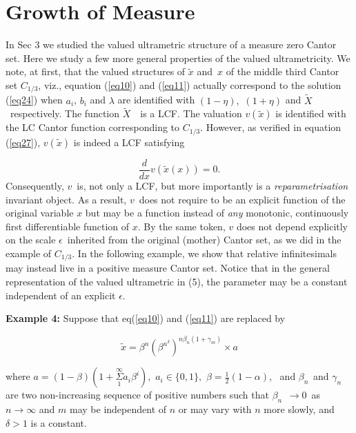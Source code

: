\documentclass[12pt]{article}
\begin{document}
\section{{Growth of Measure}}

In Sec 3 we studied the valued ultrametric structure of a measure zero
Cantor set. Here we study a few more general properties of the valued
ultrametricity. We note, at first, that the valued structures of $\tilde{x}$
and\ $x$ of the middle third Cantor set $C_{1/3}$, viz., equation (\ref{eq10})
and (\ref{eq11})  actually correspond to the solution (\ref{eq24}) when $a_i$, $b_i$ and $\lambda$ are identified with  $(1-\eta ),$ $(1+\eta )$
and $\tilde{X}$\ respectively. The function $\tilde{X}$\ \ is a LCF. The valuation $v(\tilde{x})$ is identified with the LC Cantor function corresponding to $C_{1/3}$. However, as verified in equation (\ref{eq27}), $v(\tilde{x})$ is indeed a LCF satisfying

\begin{equation*}
\frac{d}{dx}v(\tilde{x}(x))=0.
\end{equation*}%
Consequently, $v$\ is, not only a LCF,  but more
importantly is a {\em reparametrisation} invariant object. As a result, $v$\ does 
not require to be an explicit function of the original variable $x$ but may be a function
instead of {\em any} monotonic, continuously first differentiable   function of $x$. By the same token, $v$
does not depend explicitly on the scale $\epsilon $\ inherited from the original
(mother) Cantor set, as we did in the example of $C_{1/3}$. In the
following example, we show that relative infinitesimals may instead live in a
positive measure Cantor set. Notice that in the general representation of
the valued ultrametric in (5), the parameter may be a constant
independent of an explicit $\epsilon.$

{\bf Example 4:}
Suppose that eq(\ref{eq10}) and (\ref{eq11}) are replaced by


\begin{equation}\label{eq28}
\tilde{x}=\beta ^{n}\left( \beta ^{n^{\delta }}\right) ^{n\beta _{n}\left(
1+\gamma _{m}\right) }\times a
\end{equation}

\noindent where $a=(1-\beta )\left( 1+\underset{1}{\overset{\infty }{\Sigma }}%
a_{i}\beta ^{i}\right) ,$ $a_{i}\in \{0,1\},$ $\beta =\frac{1}{2}(1-\alpha )$,%
\ and $\beta _{n\text{ }}$and $\gamma _{n}$ are two non-increasing sequence
of positive numbers such that $\beta _{n\text{ }}\rightarrow 0$\ as $%
n\rightarrow \infty $ and $m$ may be independent of $n$ or may vary with $n$
more slowly, and  $\delta >1$ is a constant.
\end{document}
